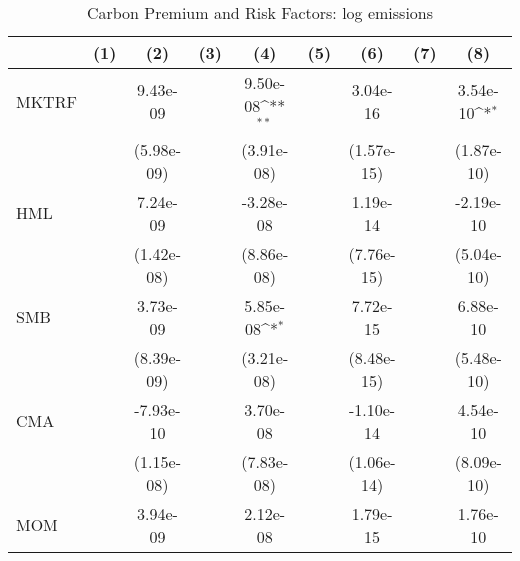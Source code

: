 \begin{table}[htbp]\centering
\def\sym#1{\ifmmode^{#1}\else\(^{#1}\)\fi}
\caption{Carbon Premium and Risk Factors: log emissions}
\begin{tabular}{l*{8}{c}}
\hline\hline
                    &\multicolumn{1}{c}{(1)}         &\multicolumn{1}{c}{(2)}         &\multicolumn{1}{c}{(3)}         &\multicolumn{1}{c}{(4)}         &\multicolumn{1}{c}{(5)}         &\multicolumn{1}{c}{(6)}         &\multicolumn{1}{c}{(7)}         &\multicolumn{1}{c}{(8)}         \\
\hline
MKTRF               &                     &    9.43e-09         &                     &    9.50e-08\sym{**} &                     &    3.04e-16         &                     &    3.54e-10\sym{*}  \\
                    &                     &  (5.98e-09)         &                     &  (3.91e-08)         &                     &  (1.57e-15)         &                     &  (1.87e-10)         \\
[1em]
HML                 &                     &    7.24e-09         &                     &   -3.28e-08         &                     &    1.19e-14         &                     &   -2.19e-10         \\
                    &                     &  (1.42e-08)         &                     &  (8.86e-08)         &                     &  (7.76e-15)         &                     &  (5.04e-10)         \\
[1em]
SMB                 &                     &    3.73e-09         &                     &    5.85e-08\sym{*}  &                     &    7.72e-15         &                     &    6.88e-10         \\
                    &                     &  (8.39e-09)         &                     &  (3.21e-08)         &                     &  (8.48e-15)         &                     &  (5.48e-10)         \\
[1em]
CMA                 &                     &   -7.93e-10         &                     &    3.70e-08         &                     &   -1.10e-14         &                     &    4.54e-10         \\
                    &                     &  (1.15e-08)         &                     &  (7.83e-08)         &                     &  (1.06e-14)         &                     &  (8.09e-10)         \\
[1em]
MOM                 &                     &    3.94e-09         &                     &    2.12e-08         &                     &    1.79e-15         &                     &    1.76e-10         \\

\end{tabular}
\end{table}
